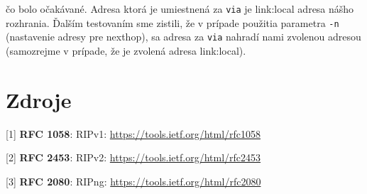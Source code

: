 \documentclass{report}
\begin{document}
    čo bolo očakávané. Adresa ktorá je umiestnená za \verb|via| je link:local adresa nášho rozhrania. Ďalším testovaním sme zistili, že v prípade použitia parametra \verb|-n| (nastavenie adresy pre nexthop), sa adresa za \verb|via| nahradí nami zvolenou adresou (samozrejme v prípade, že je zvolená adresa link:local).
    	
    \section{Zdroje}
    [1] \textbf{RFC 1058}: RIPv1: 
    \url{https://tools.ietf.org/html/rfc1058}
    
    [2] \textbf{RFC 2453}: RIPv2: 
    \url{https://tools.ietf.org/html/rfc2453}
    
    [3] \textbf{RFC 2080}: RIPng: 
    \url{https://tools.ietf.org/html/rfc2080}
	\newpage
\end{document}
